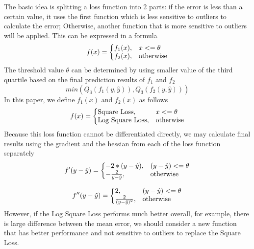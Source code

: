 \documentclass[runningheads]{llncs}
\begin{document}
The basic idea is splitting a loss function into 2 parts: if the error is less than a certain value, it uses the first function which is less sensitive to outliers to calculate the error; Otherwise, another function that is more sensitive to outliers will be applied. This can be expressed in a formula
\begin{equation}
  f(x)=\left\{
  \begin{array}{@{}ll@{}}
    f_1(x), & x<=\theta \\
    f_2(x), & \text{otherwise}
  \end{array}\right.
\end{equation}
The threshold value $\theta$ can be determined by using smaller value of the third quartile based on the final prediction results of $f_1$ and $f_2$
\begin{equation}
    min(Q_3(f_1(y, \hat{y})), Q_3(f_2(y, \hat{y})))
\end{equation}
In this paper, we define $f_1(x)$ and $f_2(x)$ as follows
\begin{equation}
  f(x)=\left\{
  \begin{array}{@{}ll@{}}
    \text{Square Loss}, & x<=\theta \\
    \text{Log Square Loss}, & \text{otherwise}
  \end{array}\right.
\end{equation}
Because this loss function cannot be differentiated directly, we may calculate final results using the gradient and the hessian from each of the loss function separately
\begin{equation}
  f'(y - \hat{y})=\left\{
  \begin{array}{@{}ll@{}}
    -2*(y - \hat{y}), &  (y - \hat{y})<=\theta \\
    -\frac{2}{y - \hat{y}}, & \text{otherwise}
  \end{array}\right.
\end{equation}

\begin{equation}
  f''(y - \hat{y})=\left\{
  \begin{array}{@{}ll@{}}
    2, & (y - \hat{y})<=\theta \\
    \frac{2}{(y - \hat{y})^2}, & \text{otherwise}
  \end{array}\right.
\end{equation}
However, if the Log Square Loss performs much better overall, for example, there is large difference between the mean error, we should consider a new function that has better performance and not sensitive to outliers to replace the Square Loss.
\end{document}
